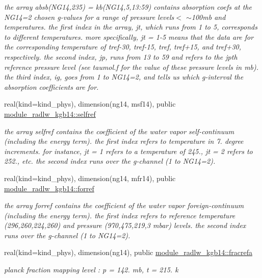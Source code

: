 \begin{Indent}
\begin{DoxyCompactItemize}
\begin{DoxyCompactList}\small\item\em the array absb(\+N\+G14,235) = kb(\+N\+G14,5,13\+:59) contains absorption coefs at the N\+G14=2 chosen g-\/values for a range of pressure levels$<$ $\sim$100mb and temperatures. the first index in the array, jt, which runs from 1 to 5, corresponds to different temperatures. more specifically, jt = 1-\/5 means that the data are for the corresponding temperature of tref-\/30, tref-\/15, tref, tref+15, and tref+30, respectively. the second index, jp, runs from 13 to 59 and refers to the jpth reference pressure level (see taumol.\+f for the value of these pressure levels in mb). the third index, ig, goes from 1 to N\+G14=2, and tells us which g-\/interval the absorption coefficients are for. \end{DoxyCompactList}\item 
real(kind=kind\+\_\+phys), dimension(ng14, msf14), public \hyperlink{group__module__radlw__kgbnn_ga0e390a41b1c9e2ece765d65774060bca}{module\+\_\+radlw\+\_\+kgb14\+::selfref}
\begin{DoxyCompactList}\small\item\em the array selfref contains the coefficient of the water vapor self-\/continuum (including the energy term). the first index refers to temperature in 7. degree increments. for instance, jt = 1 refers to a temperature of 245., jt = 2 refers to 252., etc. the second index runs over the g-\/channel (1 to N\+G14=2). \end{DoxyCompactList}\item 
real(kind=kind\+\_\+phys), dimension(ng14, mfr14), public \hyperlink{group__module__radlw__kgbnn_ga8478067cb8a07a02b56c09fa3c73eb67}{module\+\_\+radlw\+\_\+kgb14\+::forref}
\begin{DoxyCompactList}\small\item\em the array forref contains the coefficient of the water vapor foreign-\/continuum (including the energy term). the first index refers to reference temperature (296,260,224,260) and pressure (970,475,219,3 mbar) levels. the second index runs over the g-\/channel (1 to N\+G14=2). \end{DoxyCompactList}\item 
real(kind=kind\+\_\+phys), dimension(ng14), public \hyperlink{group__module__radlw__kgbnn_gae1e7065b9ea30b36a3665ad594545e9b}{module\+\_\+radlw\+\_\+kgb14\+::fracrefa}
\begin{DoxyCompactList}\small\item\em planck fraction mapping level \+: p = 142. mb, t = 215. k \end{DoxyCompactList}\item 

\end{DoxyCompactItemize}
\end{Indent}
